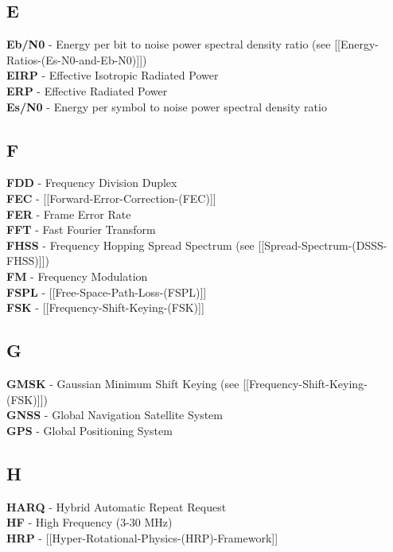 \subsection{E}\label{sec:acronyms-e}

\textbf{Eb/N0} - Energy per bit to noise power spectral density ratio
(see {[}{[}Energy-Ratios-(Es-N0-and-Eb-N0){]}{]})\\
\textbf{EIRP} - Effective Isotropic Radiated Power\\
\textbf{ERP} - Effective Radiated Power\\
\textbf{Es/N0} - Energy per symbol to noise power spectral density ratio

\subsection{F}\label{sec:acronyms-f}

\textbf{FDD} - Frequency Division Duplex\\
\textbf{FEC} - {[}{[}Forward-Error-Correction-(FEC){]}{]}\\
\textbf{FER} - Frame Error Rate\\
\textbf{FFT} - Fast Fourier Transform\\
\textbf{FHSS} - Frequency Hopping Spread Spectrum (see
{[}{[}Spread-Spectrum-(DSSS-FHSS){]}{]})\\
\textbf{FM} - Frequency Modulation\\
\textbf{FSPL} - {[}{[}Free-Space-Path-Loss-(FSPL){]}{]}\\
\textbf{FSK} - {[}{[}Frequency-Shift-Keying-(FSK){]}{]}

\subsection{G}\label{sec:acronyms-g}

\textbf{GMSK} - Gaussian Minimum Shift Keying (see
{[}{[}Frequency-Shift-Keying-(FSK){]}{]})\\
\textbf{GNSS} - Global Navigation Satellite System\\
\textbf{GPS} - Global Positioning System

\subsection{H}\label{sec:acronyms-h}

\textbf{HARQ} - Hybrid Automatic Repeat Request\\
\textbf{HF} - High Frequency (3-30 MHz)\\
\textbf{HRP} - {[}{[}Hyper-Rotational-Physics-(HRP)-Framework{]}{]}


